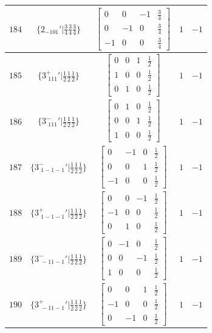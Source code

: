 \documentclass[fleqn,8pt]{jsarticle}
\begin{document}
\begin{longtable}{ccccc}
$ 184 $ & $ \{2{}_{-101}{}'|\frac{3}{4} \frac{3}{4} \frac{3}{4}\} $ & $ \begin{bmatrix} 0 & 0 & -1 & \frac{3}{4} \\ 0 & -1 & 0 & \frac{3}{4} \\ -1 & 0 & 0 & \frac{3}{4} \end{bmatrix} $ & $ 1 $ & $ -1 $ \\ \hline
$ 185 $ & $ \{3^{+}_{\,\,111}{}'|\frac{1}{2} \frac{1}{2} \frac{1}{2}\} $ & $ \begin{bmatrix} 0 & 0 & 1 & \frac{1}{2} \\ 1 & 0 & 0 & \frac{1}{2} \\ 0 & 1 & 0 & \frac{1}{2} \end{bmatrix} $ & $ 1 $ & $ -1 $ \\ \hline
$ 186 $ & $ \{3^{-}_{\,\,111}{}'|\frac{1}{2} \frac{1}{2} \frac{1}{2}\} $ & $ \begin{bmatrix} 0 & 1 & 0 & \frac{1}{2} \\ 0 & 0 & 1 & \frac{1}{2} \\ 1 & 0 & 0 & \frac{1}{2} \end{bmatrix} $ & $ 1 $ & $ -1 $ \\ \hline
$ 187 $ & $ \{3^{-}_{\,\,1-1-1}{}'|\frac{1}{2} \frac{1}{2} \frac{1}{2}\} $ & $ \begin{bmatrix} 0 & -1 & 0 & \frac{1}{2} \\ 0 & 0 & 1 & \frac{1}{2} \\ -1 & 0 & 0 & \frac{1}{2} \end{bmatrix} $ & $ 1 $ & $ -1 $ \\ \hline
$ 188 $ & $ \{3^{+}_{\,\,1-1-1}{}'|\frac{1}{2} \frac{1}{2} \frac{1}{2}\} $ & $ \begin{bmatrix} 0 & 0 & -1 & \frac{1}{2} \\ -1 & 0 & 0 & \frac{1}{2} \\ 0 & 1 & 0 & \frac{1}{2} \end{bmatrix} $ & $ 1 $ & $ -1 $ \\ \hline
$ 189 $ & $ \{3^{-}_{\,\,-11-1}{}'|\frac{1}{2} \frac{1}{2} \frac{1}{2}\} $ & $ \begin{bmatrix} 0 & -1 & 0 & \frac{1}{2} \\ 0 & 0 & -1 & \frac{1}{2} \\ 1 & 0 & 0 & \frac{1}{2} \end{bmatrix} $ & $ 1 $ & $ -1 $ \\ \hline
$ 190 $ & $ \{3^{+}_{\,\,-11-1}{}'|\frac{1}{2} \frac{1}{2} \frac{1}{2}\} $ & $ \begin{bmatrix} 0 & 0 & 1 & \frac{1}{2} \\ -1 & 0 & 0 & \frac{1}{2} \\ 0 & -1 & 0 & \frac{1}{2} \end{bmatrix} $ & $ 1 $ & $ -1 $ \\ \hline

\end{longtable}
\end{document}
